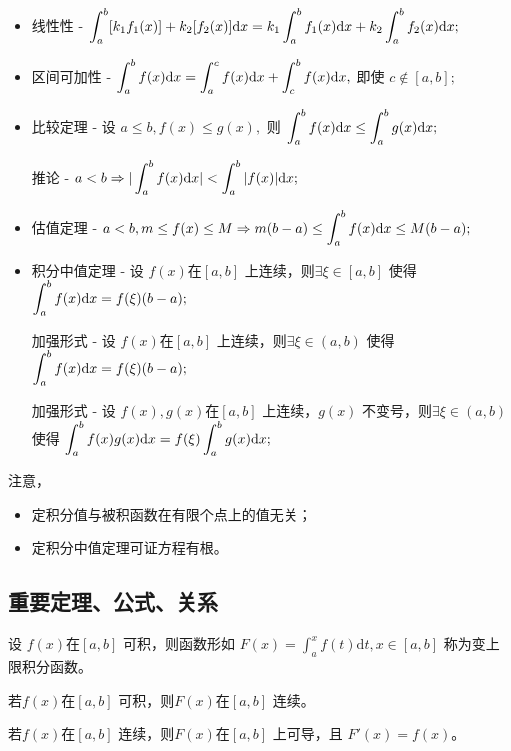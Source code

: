 \begin{itemize}
    \item 线性性 - $\displaystyle \int_a^b [k_1 f_1(x)]+k_2[f_2(x)]\mathrm{d}x = 
    k_1\int_a^b f_1(x)\mathrm{d}x + k_2\int_a^b f_2(x)\mathrm{d}x ; $
    \item 区间可加性 - $\displaystyle \int_a^b f(x)\mathrm{d}x = \int_a^c f(x)\mathrm{d}x + \int_c^b f(x)\mathrm{d}x, $
    即使 $ c\not\in [a,b] ; $
    \item 比较定理 - 设 $ a\leq b, f(x)\leq g(x), $ 则 $\displaystyle \int_a^b f(x)\mathrm{d}x \leq \int_a^b g(x)\mathrm{d}x ; $
    
    推论 - $\displaystyle a<b \Rightarrow |\int_a^b f(x) \mathrm{d}x | < \int_a^b|f(x)|\mathrm{d}x ; $
    \item 估值定理 - $\displaystyle a < b, m\leq f(x)\leq M \Rightarrow m(b-a)\leq\int_a^b f(x)\mathrm{d}x \leq M(b-a); $
    \item 积分中值定理 - 设 $ f(x) $在$ [a,b] $ 上连续，则$\exists \xi \in [a,b]  $ 
    使得 $\displaystyle \int_a^b f(x)\mathrm{d}x = f(\xi)(b-a) ; $

    加强形式 - 设 $ f(x) $在$ [a,b] $ 上连续，则$\exists \xi \in (a,b)  $ 
    使得 $\displaystyle \int_a^b f(x)\mathrm{d}x = f(\xi)(b-a) ; $

    加强形式 - 设 $ f(x),g(x) $在$ [a,b] $ 上连续，$ g(x) $ 不变号，则$\exists \xi \in (a,b)  $ 
    使得 $\displaystyle \int_a^b f(x)g(x)\mathrm{d}x = f(\xi)\int_a^bg(x)\mathrm{d}x ; $
\end{itemize}

注意，\begin{itemize}
    \item 定积分值与被积函数在有限个点上的值无关；
    \item 定积分中值定理可证方程有根。
\end{itemize}

\subsection{重要定理、公式、关系}

\begin{Def}[变上限函数]

    设 $ f(x) $在$ [a,b] $ 可积，则函数形如 $ F(x)=\int_a^x f(t)\mathrm{d}t, x\in [a,b]  $ 
    称为变上限积分函数。
\end{Def}

\begin{Theo}[变上限积分求导定理]

    若$ f(x) $在$ [a,b] $ 可积，则$ F(x) $在$ [a,b] $ 连续。

    若$ f(x) $在$ [a,b] $ 连续，则$ F(x) $在$ [a,b] $ 上可导，且 $ F'(x) = f(x) $。
\end{Theo}

